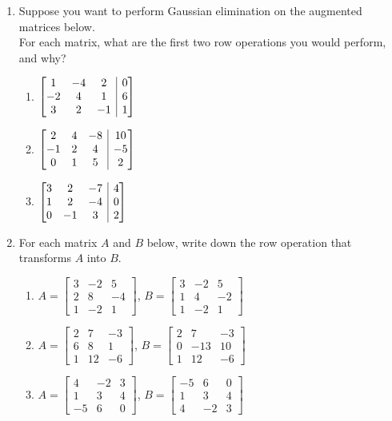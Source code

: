 \documentclass[12pt]{article}
\makeatletter
\newenvironment{amatrix}[1]{%
  \left[\begin{array}{@{}*{#1}{c}|c@{}}
}{%
  \end{array}\right]
}
\newcommand{\bbm}{\begin{bmatrix}}
\newcommand{\ebm}{\end{bmatrix}}
\newcommand{\bam}{\begin{amatrix}}
\newcommand{\eam}{\end{amatrix}}
\makeatother
\begin{document}
\begin{enumerate}
\pagebreak

\item Suppose you want to perform Gaussian elimination on the augmented matrices below. \\For each matrix, what are the first two row operations you would perform, and why?

\begin{multicols}{3}
\begin{enumerate}
\item $\bam{3} 1&-4&2&0\\-2&4&1&6\\3&2&-1&1\eam$
\item $\bam{3} 2&4&-8&10\\-1&2&4&-5\\0&1&5&2\eam$
\item $\bam{3} 3&2&-7&4\\1&2&-4&0\\0&-1&3&2\eam$
\end{enumerate}
\end{multicols}

\vspace{5cm}

\item For each matrix $A$ and $B$ below, write down the row operation that transforms $A$ into $B$.

\begin{enumerate}
\item $A = \bbm 3&-2&5\\2&8&-4\\1&-2&1\ebm$, $B = \bbm 3&-2&5\\1&4&-2\\1&-2&1\ebm$

\bigskip

\item $A = \bbm 2&7&-3\\6&8&1\\1&12&-6\ebm$, $B = \bbm 2&7&-3\\0&-13&10\\1&12&-6\ebm$

\bigskip

\item $A = \bbm 4&-2&3\\1&3&4\\-5&6&0\ebm$, $B = \bbm -5&6&0\\1&3&4\\4&-2&3\ebm$

\end{enumerate}



\end{enumerate}
\end{document}
